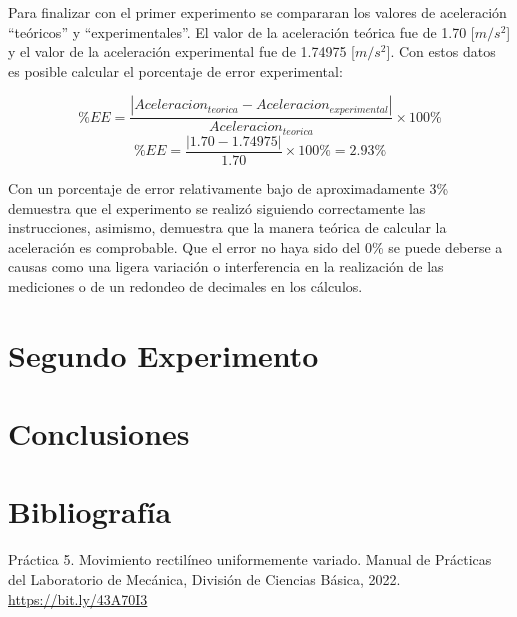 \documentclass[12pt, titlepage]{report}
\begin{document}
    Para finalizar con el primer experimento se compararan los valores de aceleración ``teóricos'' y ``experimentales''. El valor de la aceleración teórica fue de 1.70 [$m/s^2$] y el valor de la aceleración experimental fue de 1.74975 [$m/s^2$]. Con estos datos es posible calcular el porcentaje de error experimental:

    $$\%EE=\frac{|Aceleracion_{teorica}-Aceleracion_{experimental}|}{Aceleracion_{teorica}}\times100\%$$
    $$\%EE=\frac{|1.70-1.74975|}{1.70}\times100\%=2.93\%$$

    Con un porcentaje de error relativamente bajo de aproximadamente 3\% demuestra que el experimento se realizó siguiendo correctamente las instrucciones, asimismo, demuestra que la manera teórica de calcular la aceleración es comprobable. Que el error no haya sido del 0\% se puede deberse a causas como una ligera variación o interferencia en la realización de las mediciones o de un redondeo de decimales en los cálculos.

    \section*{Segundo Experimento}


    \newpage
    \section*{Conclusiones}

    \section*{Bibliografía}
    Práctica 5. Movimiento rectilíneo uniformemente variado. Manual de Prácticas del Laboratorio de Mecánica, División de Ciencias Básica, 2022. \url{https://bit.ly/43A70I3}
    
\end{document}
